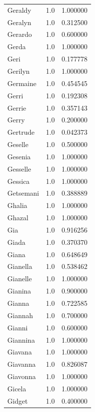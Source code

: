 \documentclass[
  letterpaper,
  DIV=11,
  numbers=noendperiod]{scrreprt}
\begin{document}
\begin{tabular}{lrr}
Geraldy         &   1.0 &   1.000000 \\
Geralyn         &   1.0 &   0.312500 \\
Gerardo         &   1.0 &   0.600000 \\
Gerda           &   1.0 &   1.000000 \\
Geri            &   1.0 &   0.177778 \\
Gerilyn         &   1.0 &   1.000000 \\
Germaine        &   1.0 &   0.454545 \\
Gerri           &   1.0 &   0.192308 \\
Gerrie          &   1.0 &   0.357143 \\
Gerry           &   1.0 &   0.200000 \\
Gertrude        &   1.0 &   0.042373 \\
Geselle         &   1.0 &   0.500000 \\
Gesenia         &   1.0 &   1.000000 \\
Gesselle        &   1.0 &   1.000000 \\
Gessica         &   1.0 &   1.000000 \\
Getsemani       &   1.0 &   0.388889 \\
Ghalia          &   1.0 &   1.000000 \\
Ghazal          &   1.0 &   1.000000 \\
Gia             &   1.0 &   0.916256 \\
Giada           &   1.0 &   0.370370 \\
Giana           &   1.0 &   0.648649 \\
Gianella        &   1.0 &   0.538462 \\
Gianelle        &   1.0 &   1.000000 \\
Gianina         &   1.0 &   0.900000 \\
Gianna          &   1.0 &   0.722585 \\
Giannah         &   1.0 &   0.700000 \\
Gianni          &   1.0 &   0.600000 \\
Giannina        &   1.0 &   1.000000 \\
Giavana         &   1.0 &   1.000000 \\
Giavanna        &   1.0 &   0.826087 \\
Giavonna        &   1.0 &   1.000000 \\
Gicela          &   1.0 &   1.000000 \\
Gidget          &   1.0 &   0.400000 \\

\end{tabular}
\end{document}
